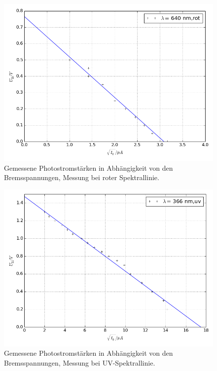 \begin{figure}[p]
	\centering
	\includegraphics[width=\textwidth]{Bilder/Fit_rot.png}
	\caption{Gemessene Photostromstärken in Abhängigkeit von den Bremsspannungen, Messung bei roter Spektrallinie.}
	\label{fig:label}
\end{figure}
\begin{figure}[p]
	\centering
	\includegraphics[width=\textwidth]{Bilder/Fit_uv.png}
	\caption{Gemessene Photostromstärken in Abhängigkeit von den Bremsspannungen, Messung bei UV-Spektrallinie.}
	\label{fig:label}
\end{figure}
